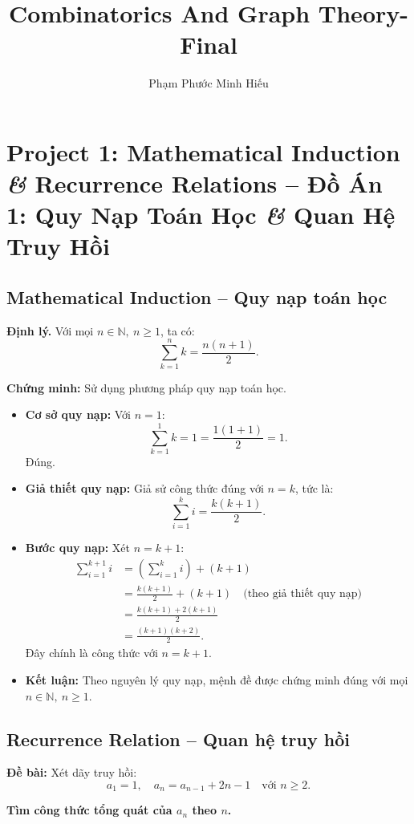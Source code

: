 \documentclass{article}
\title{Combinatorics And Graph Theory-Final}
\author{Phạm Phước Minh Hiếu}
\begin{document}
	\section*{Project 1: Mathematical Induction {\it\&} Recurrence Relations -- Đồ Án 1: Quy Nạp Toán Học {\it\&} Quan Hệ Truy Hồi}
	
	\subsection{Mathematical Induction -- Quy nạp toán học}
	
	\textbf{Định lý.} Với mọi $n \in \mathbb{N},\ n \ge 1$, ta có:
	\[
	\sum_{k=1}^{n} k = \frac{n(n+1)}{2}.
	\]
	
	\textbf{Chứng minh:} Sử dụng phương pháp quy nạp toán học.
	
	\begin{itemize}[leftmargin=1.5cm]
		\item \textbf{Cơ sở quy nạp:} Với $n = 1$:
		\[
		\sum_{k=1}^{1} k = 1 = \frac{1(1+1)}{2} = 1.
		\]
		Đúng.
		
		\item \textbf{Giả thiết quy nạp:} Giả sử công thức đúng với $n = k$, tức là:
		\[
		\sum_{i=1}^{k} i = \frac{k(k+1)}{2}.
		\]
		
		\item \textbf{Bước quy nạp:} Xét $n = k + 1$:
		\begin{align*}
			\sum_{i=1}^{k+1} i &= \left(\sum_{i=1}^{k} i\right) + (k+1) \\
			&= \frac{k(k+1)}{2} + (k+1) \quad \text{(theo giả thiết quy nạp)}\\
			&= \frac{k(k+1) + 2(k+1)}{2} \\
			&= \frac{(k+1)(k + 2)}{2}.
		\end{align*}
		Đây chính là công thức với $n = k + 1$.
		
		\item \textbf{Kết luận:} Theo nguyên lý quy nạp, mệnh đề được chứng minh đúng với mọi $n \in \mathbb{N},\ n \ge 1$.
	\end{itemize}
	
	\subsection{Recurrence Relation -- Quan hệ truy hồi}
	
	\textbf{Đề bài:} Xét dãy truy hồi:
	\[
	a_1 = 1,\quad a_n = a_{n-1} + 2n - 1 \quad \text{với } n \ge 2.
	\]
	
	\textbf{Tìm công thức tổng quát của $a_n$ theo $n$.}
	
\end{document}
